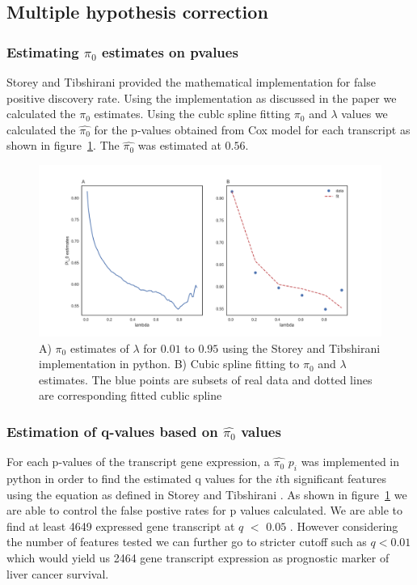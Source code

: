 \documentclass{article}
\begin{document}
	\subsection { Multiple hypothesis correction }
	
	\subsubsection {Estimating $\pi_0$ estimates on pvalues}
	
	Storey and Tibshirani \cite{storey2003statistical} provided the mathematical implementation for false positive discovery rate.  Using the implementation as discussed in the paper we calculated the $\pi_0$ estimates. Using the cublc spline fitting $\pi_0$ and  $\lambda$ values we calculated the  $\hat {\pi_0}$ for the p-values obtained from Cox model for each transcript as shown in figure~\ref{fig:estimate_pi}. The  $\hat {\pi_0}$  was estimated at $0.56$. 
\vspace{50cm} 
\begin{figure}
    \centering
     \includegraphics[width=\textwidth]{lambdaestimatescurvefitting.png}
    \caption{ A) $\pi_0$ estimates of $\lambda$  for $0.01$ to $0.95$ using the Storey and Tibshirani \cite{storey2003statistical} implementation in python. B) Cubic spline fitting to $\pi_0$  and $\lambda$ estimates. The blue points are subsets of real data and dotted lines are corresponding  fitted cublic spline   \tiny}
    \label{fig:estimate_pi}
\end{figure}

	\subsubsection {Estimation of q-values based on $\hat {\pi_0}$  values }
	 For each p-values of the transcript gene expression, a $\hat {\pi_0}$ $p_i$  was implemented in python in order to find the estimated q values for the  $i$th significant features using the equation as defined in Storey and Tibshirani \cite{storey2003statistical}. As shown in figure~\ref{fig:estimate_pi} we are able to control the false postive rates for p values calculated. We are able to find at least 4649 expressed gene transcript at $q$ $<$ $0.05$ . However considering the number of features tested we can further go to stricter cutoff such as $q < 0.01$ which would yield us 2464 gene transcript expression  as prognostic marker of liver cancer survival. 
\end{document}
